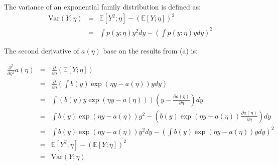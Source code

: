 \begin{answer}
    The variance of an exponential family distribution is defined as:
\begin{eqnarray*}
\text{Var}(Y; \eta) &=&  \mathbb{E}[Y^2 ;\eta] - (\mathbb{E}[Y ;\eta])^2\\
&=& \int p(y;\eta)y^2 dy - \left(\int p(y;\eta)y dy\right)^2
\end{eqnarray*}

The second derivative of $a(\eta)$ base on the results from (a) is:

\begin{eqnarray*}
\frac{\partial^2}{\partial \eta^2} a(\eta) &=& 
\frac{\partial}{\partial \eta}( \mathbb{E}[Y ;\eta])\\
&=& \frac{\partial}{\partial \eta} \left( \int b(y)\exp(\eta y - a(\eta))y dy\right)\\
 &=& \int (b(y)y\exp(\eta y - a(\eta)))(y-\frac{\partial a(\eta)}{\partial \eta} ) dy\\
 &=& \int b(y)\exp(\eta y - a(\eta))y^2-(b(y)\exp(\eta y - a(\eta))\frac{\partial a(\eta)}{\partial \eta} ) dy\\
&=& \int b(y)\exp(\eta y - a(\eta))y^2dy - \left(\int b(y)\exp(\eta y - a(\eta)) y dy \right)^2\\
&=&\mathbb{E}[Y^2 ;\eta] - (\mathbb{E}[Y ;\eta])^2\\
&=&\text{Var}(Y; \eta)
 
\end{eqnarray*}



\end{answer}
